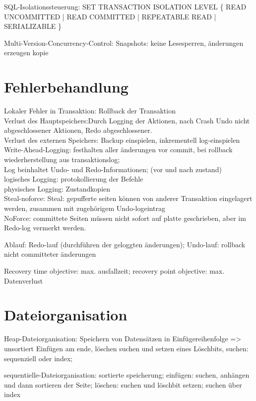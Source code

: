 SQL-Isolationssteuerung: SET TRANSACTION ISOLATION LEVEL \{ READ UNCOMMITTED | READ COMMITTED | REPEATABLE READ | SERIALIZABLE \}

Multi-Version-Concurrency-Control: Snapshots: keine Lesesperren, änderungen erzeugen kopie

\section{Fehlerbehandlung}
Lokaler Fehler in Transaktion: Rollback der Transaktion\\

Verlust des Hauptspeichers:Durch Logging der Aktionen, nach Crash Undo nicht abgeschlossener Aktionen, Redo abgeschlossener.\\
Verlust des externen Speichers: Backup einspielen, inkrementell log-einspielen\\


Write-Ahead-Logging: festhalten aller änderungen vor commit, bei rollback wiederherstellung aus transaktionslog;\\
Log beinhaltet Undo- und Redo-Informationen; (vor und nach zustand)\\
logisches Logging: protokollierung der Befehle\\
physisches Logging: Zustandkopien\\

Steal-noforce:
Steal: gepufferte seiten können von anderer Transaktion eingelagert werden, zusammen mit zugehörigem Undo-logeintrag\\
NoForce: committete Seiten müssen nicht sofort auf platte geschrieben, aber im Redo-log vermerkt werden.

Ablauf: Redo-lauf (durchführen der geloggten änderungen); Undo-lauf: rollback nicht committeter änderungen

Recovery time objective: max. ausfallzeit; recovery point objective: max. Datenverlust

\section{Dateiorganisation}
Heap-Dateiorganisation: Speichern von Datensätzen in Einfügereihenfolge => unsortiert
Einfügen am ende, löschen suchen und setzen eines Löschbits, suchen: sequenziell oder index;

sequentielle-Dateiorganisation: sortierte speicherung;
einfügen: suchen, anhängen und dann sortieren der Seite; löschen: suchen und löschbit setzen; suchen über index

